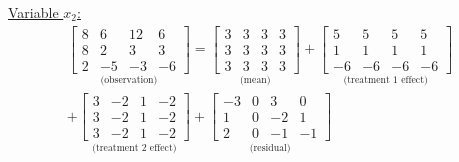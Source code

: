 \begin{enumerate}[label= (\alph*)]
    \underline{Variable $x_{2}$:}
    \begin{multline*}
        \underset{\text{(observation)}}{
            \left[
                \begin{array}{rrrr}
                    8 &  6 & 12 &  6 \\
                    8 &  2 &  3 &  3 \\
                    2 & -5 & -3 & -6
                \end{array}
            \right]
        }
        =
        \underset{\text{(mean)}}{
            \left[
                \begin{array}{rrrr}
                    3 & 3 & 3 & 3 \\
                    3 & 3 & 3 & 3 \\
                    3 & 3 & 3 & 3
                \end{array}
            \right]
        }
        +
        \underset{\text{(treatment 1 effect)}}{
            \left[
                \begin{array}{rrrr}
                     5 &  5 &  5 &  5 \\
                     1 &  1 &  1 &  1 \\
                    -6 & -6 & -6 & -6
                \end{array}
            \right]
        }
        \\
        +
        \underset{\text{(treatment 2 effect)}}{
            \left[
                \begin{array}{rrrr}
                    3 & -2 & 1 & -2 \\
                    3 & -2 & 1 & -2 \\
                    3 & -2 & 1 & -2
                \end{array}
            \right]
        }
        +
        \underset{\text{(residual)}}{
            \left[
                \begin{array}{rrrr}
                    -3 &  0 &  3 &  0 \\
                     1 &  0 & -2 &  1 \\
                     2 &  0 & -1 & -1
                \end{array}
            \right]
        }
    \end{multline*}


\end{enumerate}
